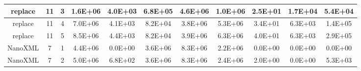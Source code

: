\begin{table*}[]
\begin{tabular}{@{}ccccccccccc@{}}
        replace                                                  & 11                                                         & 3    & 1.6E+06                                                     & 4.0E+03                                                               & 6.8E+05                                                 & 4.6E+06                                                    & 1.0E+06                                                        & 2.5E+01                                                   & 1.7E+04                                                   & 5.4E+04 \\ \midrule
        replace                                                  & 11                                                         & 4    & 7.0E+06                                                     & 4.1E+03                                                               & 8.2E+04                                                 & 3.8E+06                                                    & 5.3E+06                                                        & 3.4E+01                                                   & 6.3E+03                                                   & 1.4E+05 \\ \midrule
        replace                                                  & 11                                                         & 5    & 8.5E+06                                                     & 4.4E+03                                                               & 8.2E+04                                                 & 3.9E+06                                                    & 6.3E+06                                                        & 4.0E+01                                                   & 6.3E+03                                                   & 2.9E+05 \\ \midrule \midrule
        NanoXML                                                  & 7                                                          & 1    & 4.4E+06                                                     & 0.0E+00                                                               & 3.6E+06                                                 & 8.3E+06                                                    & 2.2E+06                                                        & 0.0E+00                                                   & 0.0E+00                                                   & 0.0E+00 \\ \midrule
        NanoXML                                                  & 7                                                          & 2    & 5.0E+06                                                     & 6.8E+02                                                               & 3.6E+06                                                 & 8.3E+06                                                    & 2.4E+06                                                        & 2.0E+00                                                   & 0.0E+00                                                   & 5.3E+03 \\ \midrule

\end{tabular}
\end{table*}
